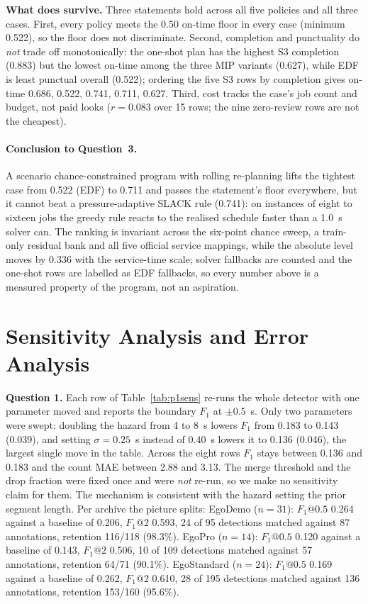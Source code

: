 \documentclass{swmcmthesis}
\begin{document}
\textbf{What does survive.} Three statements hold across all five policies and all three cases. First, every policy meets the $0.50$ on-time floor in every case (minimum 0.522), so the floor does not discriminate. Second, completion and punctuality do \emph{not} trade off monotonically: the one-shot plan has the highest S3 completion (0.883) but the lowest on-time among the three MIP variants (0.627), while EDF is least punctual overall (0.522); ordering the five S3 rows by completion gives on-time 0.686, 0.522, 0.741, 0.711, 0.627. Third, cost tracks the case's job count and budget, not paid looks ($r=0.083$ over 15 rows; the nine zero-review rows are not the cheapest).

\paragraph{Conclusion to Question~3.} A scenario chance-constrained program with rolling re-planning lifts the tightest case from 0.522 (EDF) to 0.711 and passes the statement's floor everywhere, but it cannot beat a pressure-adaptive SLACK rule (0.741): on instances of eight to sixteen jobs the greedy rule reacts to the realised schedule faster than a 1.0~s solver can. The ranking is invariant across the six-point chance sweep, a train-only residual bank and all five official service mappings, while the absolute level moves by 0.336 with the service-time scale; solver fallbacks are counted and the one-shot rows are labelled as EDF fallbacks, so every number above is a measured property of the program, not an aspiration.

\section{Sensitivity Analysis and Error Analysis}\label{sec:sens}
\textbf{Question 1.} Each row of Table~\ref{tab:p1sens} re-runs the whole detector with one parameter moved and reports the boundary $F_1$ at $\pm0.5$~s. Only two parameters were swept: doubling the hazard from 4 to 8~s lowers $F_1$ from 0.183 to 0.143 (0.039), and setting $\sigma=0.25$~s instead of $0.40$~s lowers it to 0.136 (0.046), the largest single move in the table. Across the eight rows $F_1$ stays between 0.136 and 0.183 and the count MAE between 2.88 and 3.13. The merge threshold and the drop fraction were fixed once and were \emph{not} re-run, so we make no sensitivity claim for them. The mechanism is consistent with the hazard setting the prior segment length. Per archive the picture splits: EgoDemo ($n=31$): $F_1@0.5$ 0.264 against a baseline of 0.206, $F_1@2$ 0.593, 24 of 95 detections matched against 87 annotations, retention 116/118 (98.3\%). EgoPro ($n=14$): $F_1@0.5$ 0.120 against a baseline of 0.143, $F_1@2$ 0.506, 10 of 109 detections matched against 57 annotations, retention 64/71 (90.1\%). EgoStandard ($n=24$): $F_1@0.5$ 0.169 against a baseline of 0.262, $F_1@2$ 0.610, 28 of 195 detections matched against 136 annotations, retention 153/160 (95.6\%).
\end{document}
